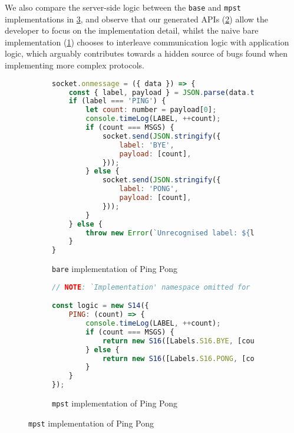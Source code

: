 We also compare the server-side logic between the \texttt{base} and
\texttt{mpst} implementations in \cref{fig:nodepingpong}, and observe
that our generated APIs (\cref{lst:nodepingpongmpst}) 
allow the developer to focus on the
implementation detail, whilst the naive bare implementation 
(\cref{lst:nodepingpongbare}) chooses to interleave communication logic
with application logic, which arguably contributes towards a hidden
source of bugs found when implementing more complex protocols.

\begin{figure}[!ht]
\centering
\begin{subfigure}[b]{\textwidth}
\centering
\begin{lstlisting}[language=javascript,tabsize=2]
socket.onmessage = ({ data }) => {
	const { label, payload } = JSON.parse(data.toString());
	if (label === 'PING') {
		let count: number = payload[0];
		console.timeLog(LABEL, ++count);
		if (count === MSGS) {
			socket.send(JSON.stringify({
				label: 'BYE',
				payload: [count],
			}));
		} else {
			socket.send(JSON.stringify({
				label: 'PONG',
				payload: [count],
			}));
		}
	} else {
		throw new Error(`Unrecognised label: ${label}`);
	}
}
\end{lstlisting}
\caption{\texttt{bare} implementation of Ping Pong }
\label{lst:nodepingpongbare}
\end{subfigure}
\hfill
\begin{subfigure}[b]{\textwidth}
\centering
\begin{lstlisting}[language=javascript,tabsize=2]
// NOTE: `Implementation' namespace omitted for brevity.

const logic = new S14({
	PING: (count) => {
		console.timeLog(LABEL, ++count);
		if (count === MSGS) {
			return new S16([Labels.S16.BYE, [count], new S15()]);
		} else {
			return new S16([Labels.S16.PONG, [count], logic]);
		}
 	}
});
\end{lstlisting}
\caption{\texttt{mpst} implementation of Ping Pong }
\label{lst:nodepingpongmpst}
\end{subfigure}
\label{fig:nodepingpong}
\end{figure}